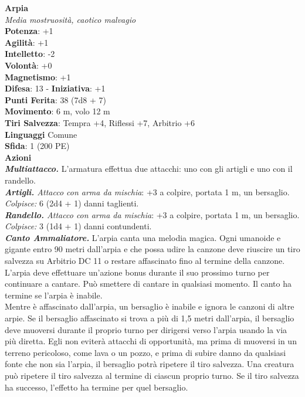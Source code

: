 \begin{multicols}{2}
\medskip\textbf{Arpia}\\
\emph{Media mostruosità, caotico malvagio}\\
\textbf{Potenza}: +1\\
\textbf{Agilità}: +1\\
\textbf{Intelletto}: -2\\
\textbf{Volontà}: +0\\
\textbf{Magnetismo}: +1\\
\textbf{Difesa}: 13 - \textbf{Iniziativa}: +1\\
\textbf{Punti Ferita}: 38 (7d8 + 7)\\
\textbf{Movimento}: 6 m, volo 12 m\\
\textbf{Tiri Salvezza}: Tempra +4, Riflessi +7, Arbitrio +6\\
\textbf{Linguaggi} Comune\\
\textbf{Sfida}: 1 (200 PE)\smallskip\\
\smallskip\textbf{Azioni}\\
\emph{\textbf{Multiattacco.}} L'armatura effettua due attacchi: uno con gli artigli e uno con il randello.\\
\emph{\textbf{Artigli.} Attacco con arma da mischia}: +3 a colpire, portata 1 m, un bersaglio.\\
\emph{Colpisce:} 6 (2d4 + 1) danni taglienti.\\
\emph{\textbf{Randello.} Attacco con arma da mischia}: +3 a colpire, portata 1 m, un bersaglio.\\
\emph{Colpisce:} 3 (1d4 + 1) danni contundenti.\\
\emph{\textbf{Canto Ammaliatore.}} L'arpia canta una melodia magica. Ogni umanoide e gigante entro 90 metri dall'arpia e che possa udire la canzone deve riuscire un tiro salvezza su Arbitrio DC 11 o restare affascinato fino al termine della canzone. L'arpia deve effettuare un'azione bonus durante il suo prossimo turno per continuare a cantare. Può smettere di cantare in qualsiasi momento. Il canto ha termine se l'arpia è inabile.\\
Mentre è affascinato dall'arpia, un bersaglio è inabile e ignora le canzoni di altre arpie. Se il bersaglio affascinato si trova a più di 1,5 metri dall'arpia, il bersaglio deve muoversi durante il proprio turno per dirigersi verso l'arpia usando la via più diretta. Egli non eviterà attacchi di opportunità, ma prima di muoversi in un terreno pericoloso, come lava o un pozzo, e prima di subire danno da qualsiasi fonte che non sia l'arpia, il bersaglio potrà ripetere il tiro salvezza. Una creatura può ripetere il tiro salvezza al termine di ciascun proprio turno. Se il tiro salvezza ha successo, l'effetto ha termine per quel bersaglio.\\

\end{multicols}
